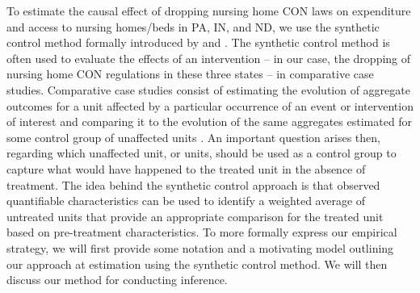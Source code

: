 \documentclass[../Main.tex]{subfiles}
\begin{document}
To estimate the causal effect of dropping nursing home CON laws on expenditure and access to nursing homes/beds in PA, IN, and ND, we use the synthetic control method formally introduced by \citet{abadie2003economic} and \citet{abadie2010synthetic}. The synthetic control method is often used to evaluate the effects of an intervention -- in our case, the dropping of nursing home CON regulations in these three states -- in comparative case studies. Comparative case studies consist of estimating the evolution of aggregate outcomes for a unit affected by a particular occurrence of an event or intervention of interest and comparing it to the evolution of the same aggregates estimated for some control group of unaffected units \citep{abadie2010synthetic}. An important question arises then, regarding which unaffected unit, or units, should be used as a control group to capture what would have happened to the treated unit in the absence of treatment. The idea behind the synthetic control approach is that observed quantifiable characteristics can be used to identify a weighted average of untreated units that provide an appropriate comparison for the treated unit based on pre-treatment characteristics. To more formally express our empirical strategy, we will first provide some notation and a motivating model outlining our approach at estimation using the synthetic control method. We will then discuss our method for conducting inference.
\end{document}
